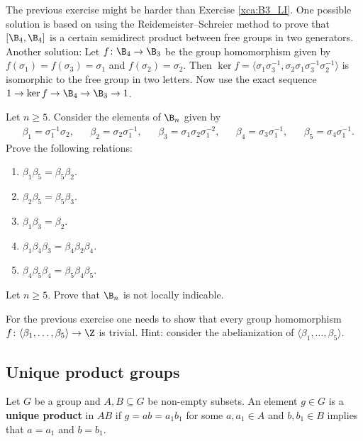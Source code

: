 The previous exercise might be harder than Exercise \ref{xca:B3_LI}. One possible solution
is based on using the Reidemeister--Schreier method to prove that 
$[\B_4,\B_4]$ is a certain semidirect product 
between free groups in two generators. Another solution: Let 
$f\colon\B_4\to\B_3$ be the group homomorphism given by $f(\sigma_1)=f(\sigma_3)=\sigma_1$ 
and $f(\sigma_2)=\sigma_2$. Then $\ker f=\langle \sigma_1\sigma_3^{-1},\sigma_2\sigma_1\sigma_3^{-1}\sigma_2^{-1}\rangle$ 
is isomorphic to the free group in two letters. Now use the exact sequence
$1\to \ker f\to\B_4\to\B_3\to1$. 

\begin{exercise}
\label{xca:relations}
    Let $n\geq5$. Consider the elements of $\B_n$ given by 
    \begin{align*}
        &\beta_1=\sigma_1^{-1}\sigma_2,
        &&\beta_2=\sigma_2\sigma_1^{-1}, 
        &&\beta_3=\sigma_1\sigma_2\sigma_1^{-2},
        &&\beta_4=\sigma_3\sigma_1^{-1}, 
        &&\beta_5=\sigma_4\sigma_1^{-1}.
    \end{align*}
    Prove the following relations:
    \begin{enumerate}
        \item $\beta_1\beta_5=\beta_5\beta_2$.
        \item $\beta_2\beta_5=\beta_5\beta_3$.
        \item $\beta_1\beta_3=\beta_2$.
        \item $\beta_1\beta_4\beta_3=\beta_4\beta_2\beta_4$.
        \item $\beta_4\beta_5\beta_4=\beta_5\beta_4\beta_5$.
    \end{enumerate}
\end{exercise}

\begin{exercise}
    Let $n\geq 5$. 
    Prove that $\B_n$ is not locally indicable.
\end{exercise}

For the previous exercise one needs to show that
every group homomorphism $f\colon \langle\beta_1,\dots,\beta_5\rangle\to\Z$ is trivial. Hint: consider
the abelianization of $\langle\beta_1,\dots,\beta_5\rangle$. 

\subsection{Unique product groups}

Let $G$ be a group and $A,B\subseteq G$ be non-empty subsets. 
An element $g\in G$ is a \textbf{unique product} in $AB$ if $g=ab=a_1b_1$ for some
$a,a_1\in
A$ and $b,b_1\in B$ implies that $a=a_1$ and $b=b_1$.

